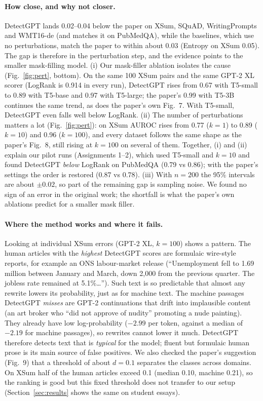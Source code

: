 \documentclass[11pt]{article}
\begin{document}
\paragraph{How close, and why not closer.} DetectGPT lands 0.02--0.04 below the paper on XSum, SQuAD, WritingPrompts and WMT16-de (and matches it on PubMedQA), while the baselines, which use no perturbations, match the paper to within about 0.03 (Entropy on XSum 0.05). The gap is therefore in the perturbation step, and the evidence points to the smaller mask-filling model. (i) Our mask-filler ablation isolates the cause (Fig.~\ref{fig:pert}, bottom). On the same 100 XSum pairs and the same GPT-2 XL scorer (LogRank is 0.914 in every run), DetectGPT rises from 0.67 with T5-small to 0.89 with T5-base and 0.97 with T5-large; the paper's 0.99 with T5-3B continues the same trend, as does the paper's own Fig.~7. With T5-small, DetectGPT even falls well below LogRank. (ii) The number of perturbations matters a lot (Fig.~\ref{fig:pert}): on XSum AUROC rises from 0.77 ($k=1$) to 0.89 ($k=10$) and 0.96 ($k=100$), and every dataset follows the same shape as the paper's Fig.~8, still rising at $k=100$ on several of them. Together, (i) and (ii) explain our pilot runs (Assignments 1--2), which used T5-small and $k=10$ and found DetectGPT \emph{below} LogRank on PubMedQA (0.79 vs 0.86); with the paper's settings the order is restored (0.87 vs 0.78). (iii) With $n=200$ the 95\% intervals are about $\pm0.02$, so part of the remaining gap is sampling noise. We found no sign of an error in the original work; the shortfall is what the paper's own ablations predict for a smaller mask filler.

\paragraph{Where the method works and where it fails.} Looking at individual XSum errors (GPT-2 XL, $k=100$) shows a pattern. The human articles with the \emph{highest} DetectGPT scores are formulaic wire-style reports, for example an ONS labour-market release (``Unemployment fell to 1.69 million between January and March, down 2,000 from the previous quarter. The jobless rate remained at 5.1\%\ldots''). Such text is so predictable that almost any rewrite lowers its probability, just as for machine text. The machine passages DetectGPT \emph{misses} are GPT-2 continuations that drift into implausible content (an art broker who ``did not approve of nudity'' promoting a nude painting). They already have low log-probability ($-2.99$ per token, against a median of $-2.19$ for machine passages), so rewrites cannot lower it much. DetectGPT therefore detects text that is \emph{typical} for the model; fluent but formulaic human prose is its main source of false positives. We also checked the paper's suggestion (Fig.~9) that a threshold of about $d=0.1$ separates the classes across domains. On XSum half of the human articles exceed 0.1 (median 0.10, machine 0.21), so the ranking is good but this fixed threshold does not transfer to our setup (Section~\ref{sec:results} shows the same on student essays).
\end{document}
